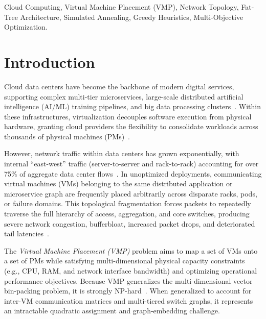 \documentclass[conference]{IEEEtran}
\begin{document}
\begin{IEEEkeywords}
Cloud Computing, Virtual Machine Placement (VMP), Network Topology, Fat-Tree Architecture, Simulated Annealing, Greedy Heuristics, Multi-Objective Optimization.
\end{IEEEkeywords}

\section{Introduction}
Cloud data centers have become the backbone of modern digital services, supporting complex multi-tier microservices, large-scale distributed artificial intelligence (AI/ML) training pipelines, and big data processing clusters~\cite{greenberg2009cost}. Within these infrastructures, virtualization decouples software execution from physical hardware, granting cloud providers the flexibility to consolidate workloads across thousands of physical machines (PMs)~\cite{beloglazov2012optimal}. 

However, network traffic within data centers has grown exponentially, with internal ``east-west'' traffic (server-to-server and rack-to-rack) accounting for over 75\% of aggregate data center flows~\cite{al2008scalable}. In unoptimized deployments, communicating virtual machines (VMs) belonging to the same distributed application or microservice graph are frequently placed arbitrarily across disparate racks, pods, or failure domains. This topological fragmentation forces packets to repeatedly traverse the full hierarchy of access, aggregation, and core switches, producing severe network congestion, bufferbloat, increased packet drops, and deteriorated tail latencies~\cite{meng2010improving, alicherry2012network}.

The \emph{Virtual Machine Placement (VMP)} problem aims to map a set of VMs onto a set of PMs while satisfying multi-dimensional physical capacity constraints (e.g., CPU, RAM, and network interface bandwidth) and optimizing operational performance objectives. Because VMP generalizes the multi-dimensional vector bin-packing problem, it is strongly NP-hard~\cite{mann2015allocation}. When generalized to account for inter-VM communication matrices and multi-tiered switch graphs, it represents an intractable quadratic assignment and graph-embedding challenge.
\end{document}

